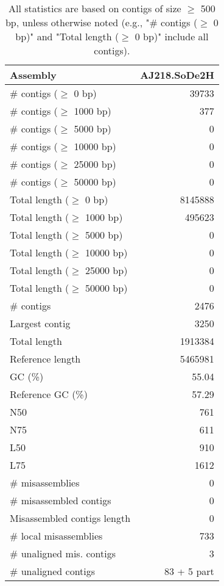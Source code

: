 \documentclass[12pt,a4paper]{article}
\begin{document}
\begin{table}[ht]
\begin{center}
\caption{All statistics are based on contigs of size $\geq$ 500 bp, unless otherwise noted (e.g., "\# contigs ($\geq$ 0 bp)" and "Total length ($\geq$ 0 bp)" include all contigs).}
\begin{tabular}{|l*{1}{|r}|}
\hline
Assembly & AJ218.SoDe2H \\ \hline
\# contigs ($\geq$ 0 bp) & 39733 \\ \hline
\# contigs ($\geq$ 1000 bp) & 377 \\ \hline
\# contigs ($\geq$ 5000 bp) & 0 \\ \hline
\# contigs ($\geq$ 10000 bp) & 0 \\ \hline
\# contigs ($\geq$ 25000 bp) & 0 \\ \hline
\# contigs ($\geq$ 50000 bp) & 0 \\ \hline
Total length ($\geq$ 0 bp) & 8145888 \\ \hline
Total length ($\geq$ 1000 bp) & 495623 \\ \hline
Total length ($\geq$ 5000 bp) & 0 \\ \hline
Total length ($\geq$ 10000 bp) & 0 \\ \hline
Total length ($\geq$ 25000 bp) & 0 \\ \hline
Total length ($\geq$ 50000 bp) & 0 \\ \hline
\# contigs & 2476 \\ \hline
Largest contig & 3250 \\ \hline
Total length & 1913384 \\ \hline
Reference length & 5465981 \\ \hline
GC (\%) & 55.04 \\ \hline
Reference GC (\%) & 57.29 \\ \hline
N50 & 761 \\ \hline
N75 & 611 \\ \hline
L50 & 910 \\ \hline
L75 & 1612 \\ \hline
\# misassemblies & 0 \\ \hline
\# misassembled contigs & 0 \\ \hline
Misassembled contigs length & 0 \\ \hline
\# local misassemblies & 733 \\ \hline
\# unaligned mis. contigs & 3 \\ \hline
\# unaligned contigs & 83 + 5 part \\ \hline

\end{tabular}
\end{center}
\end{table}
\end{document}
